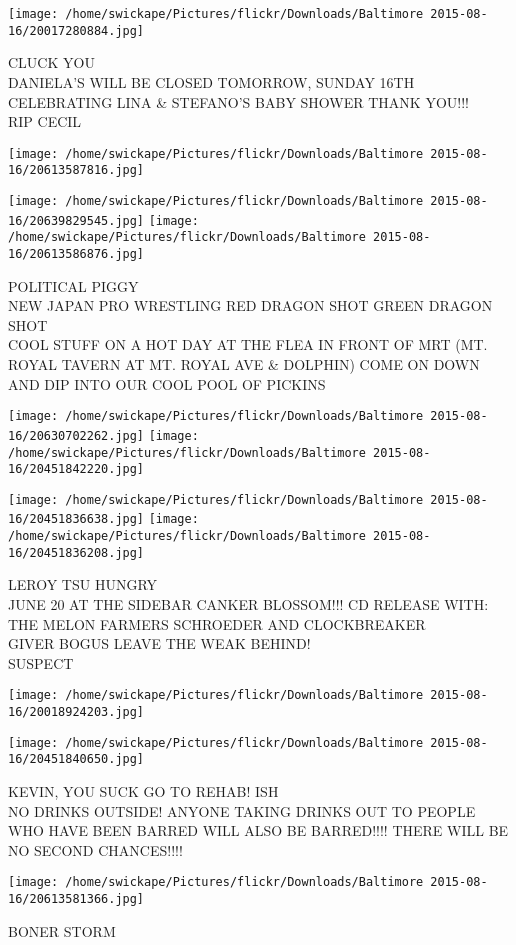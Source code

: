 \documentclass[10pt,letterpaper]{article}
\begin{document}
\vspace{0.25in}
\texttt{[image: /home/swickape/Pictures/flickr/Downloads/Baltimore 2015-08-16/20017280884.jpg]}

CLUCK YOU\\
DANIELA'S WILL BE CLOSED TOMORROW, SUNDAY 16TH CELEBRATING LINA \& STEFANO'S BABY SHOWER THANK YOU!!!\\
RIP CECIL
\pagebreak

\texttt{[image: /home/swickape/Pictures/flickr/Downloads/Baltimore 2015-08-16/20613587816.jpg]}

\vspace{0.25in}
\texttt{[image: /home/swickape/Pictures/flickr/Downloads/Baltimore 2015-08-16/20639829545.jpg]}
\texttt{[image: /home/swickape/Pictures/flickr/Downloads/Baltimore 2015-08-16/20613586876.jpg]}

POLITICAL PIGGY\\
NEW JAPAN PRO WRESTLING RED DRAGON SHOT GREEN DRAGON SHOT\\
COOL STUFF ON A HOT DAY AT THE FLEA IN FRONT OF MRT (MT. ROYAL TAVERN AT MT. ROYAL AVE \& DOLPHIN) COME ON DOWN AND DIP INTO OUR COOL POOL OF PICKINS
\pagebreak

\texttt{[image: /home/swickape/Pictures/flickr/Downloads/Baltimore 2015-08-16/20630702262.jpg]}
\texttt{[image: /home/swickape/Pictures/flickr/Downloads/Baltimore 2015-08-16/20451842220.jpg]}

\texttt{[image: /home/swickape/Pictures/flickr/Downloads/Baltimore 2015-08-16/20451836638.jpg]}
\texttt{[image: /home/swickape/Pictures/flickr/Downloads/Baltimore 2015-08-16/20451836208.jpg]}

LEROY TSU HUNGRY\\
JUNE 20 AT THE SIDEBAR CANKER BLOSSOM!!! CD RELEASE WITH: THE MELON FARMERS SCHROEDER AND CLOCKBREAKER\\
GIVER BOGUS LEAVE THE WEAK BEHIND!\\
SUSPECT
\pagebreak

\texttt{[image: /home/swickape/Pictures/flickr/Downloads/Baltimore 2015-08-16/20018924203.jpg]}

\vspace{0.25in}
\texttt{[image: /home/swickape/Pictures/flickr/Downloads/Baltimore 2015-08-16/20451840650.jpg]}

KEVIN, YOU SUCK GO TO REHAB! ISH\\
NO DRINKS OUTSIDE!  ANYONE TAKING DRINKS OUT TO PEOPLE WHO HAVE BEEN BARRED WILL ALSO BE BARRED!!!! THERE WILL BE NO SECOND CHANCES!!!!
\pagebreak

\texttt{[image: /home/swickape/Pictures/flickr/Downloads/Baltimore 2015-08-16/20613581366.jpg]}

BONER STORM
\pagebreak
\end{document}

